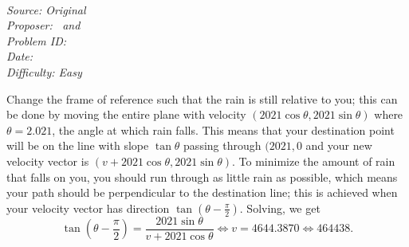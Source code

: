 \SSbreak\\
\emph{Source: Original}\\
\emph{Proposer: \Ptan\, and \Pwen}\\
\emph{Problem ID:}\\
\emph{Date: }\\
\emph{Difficulty: Easy}\\
\SSbreak

\bigskip

\begin{solution}\hfil\medskip
  
    Change the frame of reference such that the rain is still relative to you; this can be done by moving the entire plane with velocity $(2021 \cos \theta, 2021 \sin \theta)$
    where $\theta = 2.021$, the angle at which rain falls. This means that your destination point will be on the line with slope $\tan \theta$ passing through $(2021, 0$
    and your new velocity vector is $(v + 2021 \cos \theta, 2021 \sin \theta)$. To minimize the amount of rain that falls on you, you should run through as little rain
    as possible, which means your path should be perpendicular to the destination line; this is achieved when your velocity vector has direction $\tan \left(\theta - \frac{\pi}{2}\right).$
    Solving, we get $$\tan \left(\theta - \dfrac{\pi}{2}\right) = \dfrac{2021 \sin \theta}{v + 2021 \cos \theta} \iff v = 4644.3870 \iff \boxed{464438}.$$
\end{solution}\bigskip
